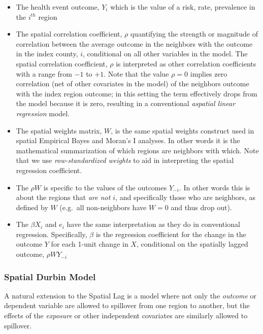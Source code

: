\documentclass[
]{book}
\providecommand{\tightlist}{%
  \setlength{\itemsep}{0pt}\setlength{\parskip}{0pt}}
\begin{document}
\begin{itemize}
\tightlist
\item
  The health event outcome, \(Y_i\) which is the value of a risk, rate, prevalence in the \(i^{th}\) region
\item
  The spatial correlation coefficient, \(\rho\) quantifying the strength or magnitude of correlation between the average outcome in the neighbors with the outcome in the index county, \(i\), conditional on all other variables in the model. The spatial correlation coefficient, \(\rho\) is interpreted as other correlation coefficients with a range from \(-1\) to \(+1\). Note that the value \(\rho=0\) implies zero correlation (net of other covariates in the model) of the neighbors outcome with the index region outcome; in this setting the term effectively drops from the model because it is zero, resulting in a conventional \emph{aspatial linear regression} model.
\item
  The spatial weights matrix, \(W\), is the same spatial weights construct used in spatial Empirical Bayes and Moran's I analyses. In other words it is the mathematical summarization of which regions are neighbors with which. Note that we use \emph{row-standardized weights} to aid in interpreting the spatial regression coefficient.
\item
  The \(\rho W\) is specific to the values of the outcomes \(Y_{-i}\). In other words this is about the regions that \emph{are not \(i\)}, and specifically those who are neighbors, as defined by \(W\) (e.g.~all non-neighbors have \(W=0\) and thus drop out).
\item
  The \(\beta X_i\) and \(e_i\) have the same interpretation as they do in conventional regression. Specifically, \(\beta\) is the regression coefficient for the change in the outcome \(Y\) for each 1-unit change in \(X\), conditional on the spatially lagged outcome, \(\rho WY_{-i}\)
\end{itemize}

\hypertarget{spatial-durbin-model}{%
\subsubsection{Spatial Durbin Model}\label{spatial-durbin-model}}

A natural extension to the Spatial Lag is a model where not only the \emph{outcome} or dependent variable are allowed to spillover from one region to another, but the effects of the \emph{exposure} or other independent covariates are similarly allowed to spillover.
\end{document}
